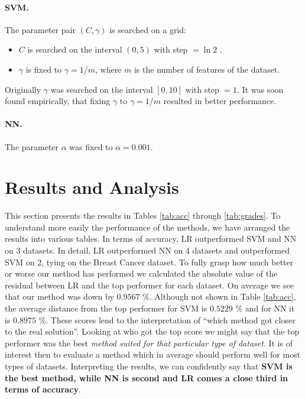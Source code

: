 \documentclass{INGUADY}
\begin{document}
\paragraph{\textbf{SVM.}}
The parameter pair $(C, \gamma)$ is searched on a grid:
\begin{itemize}
\item $C$ is searched on the interval $(0, 5)$ with step $ = \ln 2$ .
\item $\gamma$ is fixed to $\gamma = 1 / m$, where $m$ is the number of features of the dataset.
\end{itemize}
Originally $\gamma$ was searched on the interval $[0, 10]$ with step $= 1$. It was soon found empirically, that fixing $\gamma$ to $\gamma = 1 / m$ resulted in better performance.

\paragraph{\textbf{NN.}}
The parameter $\alpha$ was fixed to $\alpha = 0.001$.

\section{Results and Analysis}
This section presents the results in Tables \ref{tab:acc} through \ref{tab:grades}. To understand more easily the performance of the methods, we have arranged the results into various tables. In terms of accuracy,  LR outperformed SVM and NN on 3 datasets. In detail, LR outperformed NN on 4 datasets and outperformed SVM on 2, tying on the Breast Cancer dataset. To fully grasp how much better or worse our method has performed we calculated the absolute value of the residual between LR and the top performer for each dataset. On average we see that our method was down by $0.9567$ \%. Although not shown in Table \ref{tab:acc}, the average distance from the top performer for SVM is $0.5229$ \% and for NN it is $0.8975$ \%. These scores lend to the interpretation of ``which method got closer to the real solution''. Looking at who got the top score we might say that the top performer was the best \textit{method suited for that particular type of dataset}. It is of interest then to evaluate a method which in average should perform well for most types of datasets. Interpreting the results, we can confidently say that \textbf{SVM is the best method, while NN is second and LR comes a close third in terms of accuracy}.
\end{document}
